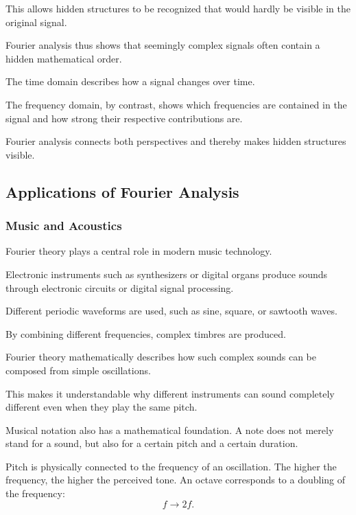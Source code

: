 This allows hidden structures to be recognized
that would hardly be visible in the original signal.

Fourier analysis thus shows
that seemingly complex signals
often contain a hidden mathematical order.

\begin{NoteBox}
	\small
	\label{box:fourier-zeitbereich-frequenzbereich}
	The time domain describes
	how a signal changes over time.
	
	The frequency domain, by contrast, shows
	which frequencies are contained in the signal
	and how strong their respective contributions are.
	
	Fourier analysis connects both perspectives
	and thereby makes hidden structures visible.
\end{NoteBox}
\newpage
\noindent
\subsection{Applications of Fourier Analysis}

\subsubsection*{Music and Acoustics}

Fourier theory plays a central role in modern music technology.

Electronic instruments such as synthesizers or digital organs
produce sounds through electronic circuits or digital signal processing.

Different periodic waveforms are used,
such as sine,
square,
or sawtooth waves.

By combining different frequencies,
complex timbres are produced.

Fourier theory mathematically describes
how such complex sounds
can be composed from simple oscillations.

This makes it understandable
why different instruments can sound completely different
even when they play the same pitch.

\medskip

Musical notation also has a mathematical foundation.
A note does not merely stand for a sound,
but also for a certain pitch and a certain duration.

Pitch is physically connected to the frequency of an oscillation.
The higher the frequency,
the higher the perceived tone.
An octave corresponds to a doubling of the frequency:
\[
f \longrightarrow 2f.
\]

